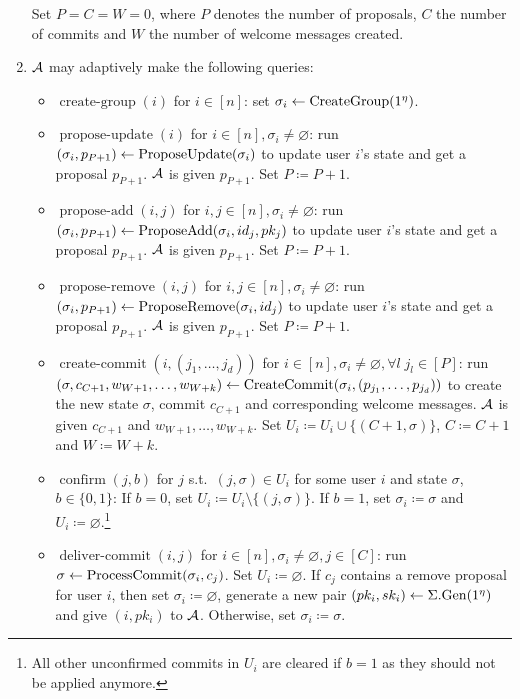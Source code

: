 \begin{definition}
\begin{enumerate}[1.]
		      Set $P = C = W = 0$, where $P$ denotes the number of proposals, $C$ the number of commits and $W$ the number of welcome messages created.
		\item $\mathcal{A}$ may adaptively make the following queries:
		      \begin{itemize}
			      \item $\operatorname{create-group}(i)$ for $i \in [n]$: set $\sigma_i \leftarrow \operatorname{CreateGroup}(1^\eta)$.
			      \item $\operatorname{propose-update}(i)$ for $i \in [n], \sigma_i \neq \varnothing$: run $(\sigma_i, p_{P + 1}) \leftarrow \operatorname{ProposeUpdate}(\sigma_i)$ to update user $i$'s state and get a proposal $p_{P + 1}$. $\mathcal{A}$ is given $p_{P + 1}$. Set $P \coloneqq P + 1$.
			      \item $\operatorname{propose-add}(i, j)$ for $i, j \in [n], \sigma_i \neq \varnothing$: run $(\sigma_i, p_{P + 1}) \leftarrow \operatorname{ProposeAdd}(\sigma_i, id_j, pk_j)$ to update user $i$'s state and get a proposal $p_{P + 1}$. $\mathcal{A}$ is given $p_{P + 1}$. Set $P \coloneqq P + 1$.
			      \item $\operatorname{propose-remove}(i, j)$ for $i, j \in [n], \sigma_i \neq \varnothing$: run $(\sigma_i, p_{P + 1}) \leftarrow \operatorname{ProposeRemove}(\sigma_i, id_j)$ to update user $i$'s state and get a proposal $p_{P + 1}$. $\mathcal{A}$ is given $p_{P + 1}$. Set $P \coloneqq P + 1$.
			      \item $\operatorname{create-commit}(i, (j_1, \ldots, j_d))$ for $i \in [n], \sigma_i \neq \varnothing, \forall l \; j_l \in [P]$: run $(\sigma, c_{C + 1}, w_{W + 1}, \ldots, w_{W + k}) \leftarrow \operatorname{CreateCommit}(\sigma_i, (p_{j_1}, \ldots, p_{j_d}))$ to create the new state $\sigma$, commit $c_{C + 1}$ and corresponding welcome messages. $\mathcal{A}$ is given $c_{C + 1}$ and $w_{W + 1}, \ldots, w_{W + k}$. Set $U_i \coloneqq U_i \cup \{(C + 1, \sigma)\}$, $C \coloneqq C + 1$ and $W \coloneqq W + k$.
			      \item $\operatorname{confirm}(j, b)$ for $j$ s.t.~$(j, \sigma) \in U_i$ for some user $i$ and state $\sigma$, $b \in \{0, 1\}$: If $b = 0$, set $U_i \coloneqq U_i \setminus \{(j, \sigma)\}$. If $b = 1$, set $\sigma_i \coloneqq \sigma$ and $U_i \coloneqq \varnothing$.\footnote{All other unconfirmed commits in $U_i$ are cleared if $b = 1$ as they should not be applied anymore.}
			      \item $\operatorname{deliver-commit}(i, j)$ for $i \in [n], \sigma_i \neq \varnothing, j \in [C]$: run $\sigma \leftarrow \operatorname{ProcessCommit}(\sigma_i, c_j)$. Set $U_i \coloneqq \varnothing$. If $c_j$ contains a remove proposal for user $i$, then set $\sigma_i \coloneqq \varnothing$, generate a new pair $(pk_i, sk_i) \leftarrow \Sigma.\mathrm{Gen}(1^\eta)$ and give $(i, pk_i)$ to $\mathcal{A}$. Otherwise, set $\sigma_i \coloneqq \sigma$.

\end{itemize}
\end{enumerate}
\end{definition}
